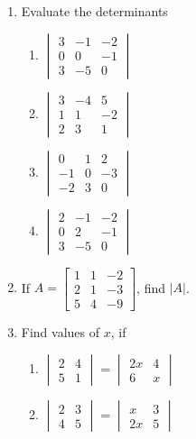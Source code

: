 \documentclass[12pt]{article}
\begin{document}
\begin{enumerate}
\begin{enumerate}[label=\roman*)]
\item Evaluate the determinants
\begin{enumerate}[label=\roman*)]
    \item 
    $\begin{vmatrix} 3 & -1 & -2 \\ 0 & 0 & -1 \\ 3 & -5 & 0 \end{vmatrix}$\quad
    \item
    $\begin{vmatrix} 3 & -4 & 5 \\ 1 & 1 & -2 \\ 2 & 3 & 1 \end{vmatrix}$
     \item
    $\begin{vmatrix} 0 & 1 & 2 \\ -1 & 0 & -3 \\ -2 & 3 & 0 \end{vmatrix}$\quad
    \item
    $\begin{vmatrix} 2 & -1 & -2 \\ 0 & 2 & -1 \\ 3 & -5 & 0 \end{vmatrix}$
\end{enumerate}

 \item If $A = \begin{bmatrix} 1 & 1 & -2 \\ 2 & 1 & -3 \\ 5 & 4 & -9 \end{bmatrix}$, find $|A|$.

\item Find values of $x$, if\\
\begin{enumerate}[label=\roman*)]
    \item
    $\begin{vmatrix} 2 & 4 \\ 5 & 1 \end{vmatrix} = \begin{vmatrix} 2x & 4 \\ 6 & x \end{vmatrix}$\quad
    \item
    $\begin{vmatrix} 2 & 3 \\ 4 & 5 \end{vmatrix} = \begin{vmatrix} x & 3 \\ 2x & 5 \end{vmatrix}$
\end{enumerate}


\end{enumerate}
\end{enumerate}
\end{document}
